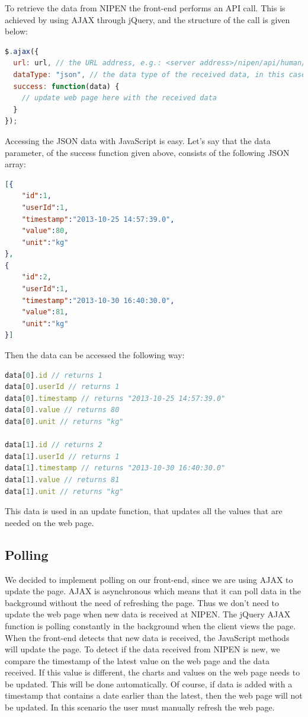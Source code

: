 To retrieve the data from NIPEN the front-end performs an API call.
This is achieved by using AJAX through jQuery, and the structure of the call is given below:

\begin{lstlisting}[language=JavaScript]
$.ajax({
  url: url, // the URL address, e.g.: <server address>/nipen/api/human/weights
  dataType: "json", // the data type of the received data, in this case a JSON string
  success: function(data) {
    // update web page here with the received data
  }
});
\end{lstlisting}

Accessing the JSON data with JavaScript is easy.
Let's say that the data parameter, of the success function given above, consists of the following JSON array:

\begin{lstlisting}[language=json]
[{
    "id":1,
    "userId":1,
    "timestamp":"2013-10-25 14:57:39.0",
    "value":80,
    "unit":"kg"
},
{
    "id":2,
    "userId":1,
    "timestamp":"2013-10-30 16:40:30.0",
    "value":81,
    "unit":"kg"
}]
\end{lstlisting} 

Then the data can be accessed the following way:

\begin{lstlisting}[language=JavaScript]
data[0].id // returns 1
data[0].userId // returns 1
data[0].timestamp // returns "2013-10-25 14:57:39.0"
data[0].value // returns 80
data[0].unit // returns "kg"

data[1].id // returns 2
data[1].userId // returns 1
data[1].timestamp // returns "2013-10-30 16:40:30.0"
data[1].value // returns 81
data[1].unit // returns "kg"
\end{lstlisting}

This data is used in an update function, that updates all the values that are needed on the web page.

\subsection{Polling}

We decided to implement polling on our front-end, since we are using AJAX to update the page.
AJAX is asynchronous which means that it can poll data in the background without the need of refreshing the page.
Thus we don't need to update the web page when new data is received at NIPEN.
The jQuery AJAX function is polling constantly in the background when the client views the page.
When the front-end detects that new data is received, the JavaScript methods will update the page.
To detect if the data received from NIPEN is new, we compare the timestamp of the latest value on the web page and the data received.
If this value is different, the charts and values on the web page needs to be updated.
This will be done automatically.
Of course, if data is added with a timestamp that contains a date earlier than the latest, then the web page will not be updated.
In this scenario the user must manually refresh the web page.

